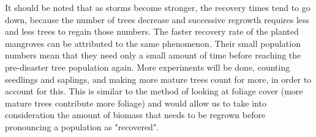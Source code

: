 It should be noted that as storms become
stronger, the recovery times tend to go down, because the number of trees decrease and 
successive regrowth requires less and less trees to regain those numbers. The faster recovery rate of the planted mangroves can
be attributed to the same phenomenon. Their small population numbers mean that they need only a small amount of time before reaching the pre-disaster tree population again. More experiments will be done, counting seedlings and saplings, and making more mature trees count for more, in order to account for this. This is similar to the method of looking at foliage cover (more mature trees contribute more foliage) and would allow us to take into consideration the amount of biomass that needs to be regrown before pronouncing a population as "recovered".